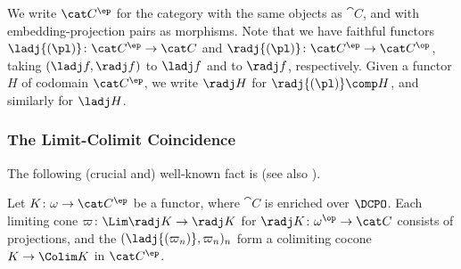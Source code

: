 We write $\cat C^\ep$ for the category with the same objects as $\cat C$,
and with embedding-projection pairs as morphisms.
Note that we have faithful functors
$\ladj{(\pl)} \colon \cat C^\ep \to \cat C$
and
$\radj{(\pl)} \colon \cat C^\ep \to \cat C^\op$,
taking $(\ladj f,\radj f)$ to $\ladj f$ and to $\radj f$,
respectively.
Given a functor $H$ of codomain $\cat C^\ep$,
we write $\radj H$ for $\radj{(\pl)} \comp H$,
and similarly for $\ladj H$.



\subsubsection{The Limit-Colimit Coincidence}
The following (crucial and) well-known fact
is \cite[Theorem 7.1.10]{ac98book}
(see also \cite[Theorem 3.3.7]{aj95chapter}).


\begin{theorem}
\label{thm:proof:scott:limcolim}
Let $K \colon \omega \to \cat C^\ep$ be a functor,
where $\cat C$ is enriched over $\DCPO$.
Each limiting cone $\varpi \colon \Lim \radj K \to \radj K$
for $\radj K \colon \omega^\op \to \cat C$ consists of projections,
and the $(\ladj{(\varpi_n)},\varpi_n)_n$
form a colimiting cocone
$K \to \Colim K$ in $\cat C^\ep$.
\end{theorem}

